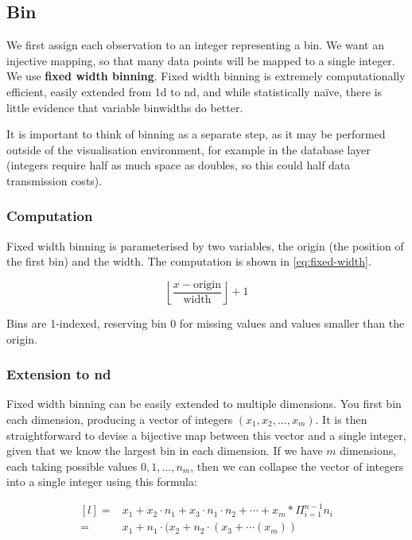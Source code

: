\documentclass[journal]{vgtc}                %
\begin{document}
\subsection{Bin}
\label{sub:bin}

We first assign each observation to an integer representing a bin. We want an injective mapping, so that many data points will be mapped to a single integer.
We use {\bf fixed width binning}. Fixed width binning is extremely computationally efficient, easily extended from 1d to nd, and while statistically na\"ive, there is little evidence that variable binwidths do better. 

It is important to think of binning as a separate step, as it may be performed outside of the visualisation environment, for example in the database layer (integers require half as much space as doubles, so this could half data transmission costs). 

\subsubsection{Computation}

Fixed width binning is parameterised by two variables, the origin (the position of the first bin) and the width. The computation is shown in \eqref{eq:fixed-width}.

\begin{equation}
  \label{eq:fixed-width}
  \left \lfloor \frac{x - \text{origin}}{\text{width}} \right \rfloor + 1
\end{equation}

Bins are 1-indexed, reserving bin 0 for missing values and values smaller than the origin.

\subsubsection{Extension to nd}

Fixed width binning can be easily extended to multiple dimensions. You first bin each dimension, producing a vector of integers $(x_1, x_2, ..., x_m)$. It is then straightforward to devise a bijective map between this vector and a single integer, given that we know the largest bin in each dimension. If we have $m$ dimensions, each taking possible values $0, 1, \ldots, n_m$, then we can collapse the vector of integers into a single integer using this formula:

\begin{equation}
  \label{eq:nd-bins}
  \begin{matrix*}[l]
   = & x_1 + x_2 \cdot n_1 + x_3 \cdot n_1 \cdot n_2 + \cdots + x_m * \Pi^{n-1}_{i = 1} n_i \\
   = & x_1 + n_1 \cdot (x_2 + n_2 \cdot (x_3 + \cdots(x_m))
  \end{matrix*}
\end{equation}
\end{document}

